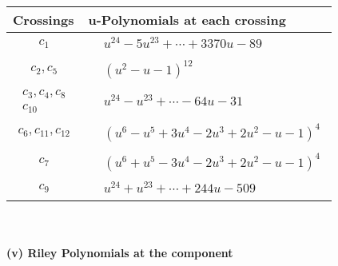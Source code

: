 \documentclass[1p]{elsarticle_modified}
\theoremstyle{definition}
\begin{document}
\begin{tabular}{m{50pt}|m{274pt}}
Crossings & \hspace{64pt}u-Polynomials at each crossing \\
\hline $$\begin{aligned}c_{1}\end{aligned}$$&$\begin{aligned}
&u^{24}-5 u^{23}+\cdots+3370 u-89
\end{aligned}$\\
\hline $$\begin{aligned}c_{2},c_{5}\end{aligned}$$&$\begin{aligned}
&(u^2- u-1)^{12}
\end{aligned}$\\
\hline $$\begin{aligned}c_{3},c_{4},c_{8}\\c_{10}\end{aligned}$$&$\begin{aligned}
&u^{24}- u^{23}+\cdots-64 u-31
\end{aligned}$\\
\hline $$\begin{aligned}c_{6},c_{11},c_{12}\end{aligned}$$&$\begin{aligned}
&(u^6- u^5+3 u^4-2 u^3+2 u^2- u-1)^4
\end{aligned}$\\
\hline $$\begin{aligned}c_{7}\end{aligned}$$&$\begin{aligned}
&(u^6+u^5-3 u^4-2 u^3+2 u^2- u-1)^4
\end{aligned}$\\
\hline $$\begin{aligned}c_{9}\end{aligned}$$&$\begin{aligned}
&u^{24}+u^{23}+\cdots+244 u-509
\end{aligned}$\\
\hline
\end{tabular}\\~\\
\newpage\renewcommand{\arraystretch}{1}
\flushleft \textbf{(v) Riley Polynomials at the component}\newline \\
\end{document}
